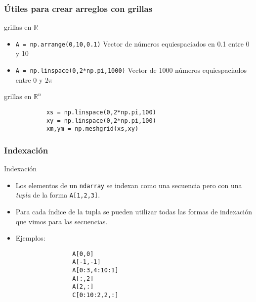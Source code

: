 \documentclass{beamer}
\begin{document}
\begin{frame}[fragile]
    \frametitle{Útiles para crear arreglos con grillas}
    \begin{block}{grillas en $\mathbb{R}$}
        \begin{itemize}
            \item \texttt{A = np.arrange(0,10,0.1)} Vector de números equiespaciados en 0.1 entre 0 y 10
            \item \texttt{A = np.linspace(0,2*np.pi,1000)} Vector de 1000 números equiespaciados entre 0 y $2\pi$
        \end{itemize}
    \end{block}
    \begin{block}{grillas en $\mathbb{R}^n$}
        \begin{verbatim}
            xs = np.linspace(0,2*np.pi,100)
            xy = np.linspace(0,2*np.pi,100)
            xm,ym = np.meshgrid(xs,xy)
        \end{verbatim}
    \end{block}
    \end{frame}


\begin{frame}[fragile]
    \frametitle{Indexación}
    \begin{block}{Indexación}
        \begin{itemize}
            \item Los elementos de un {\tt ndarray} se indexan como una secuencia pero con una {\em tupla} de la forma \texttt{A[1,2,3]}.
            \item Para cada índice de la tupla se pueden utilizar todas las formas de indexación que vimos para las secuencias.
            \item Ejemplos:
            \begin{verbatim}
                A[0,0]
                A[-1,-1] 
                A[0:3,4:10:1]
                A[:,2]
                A[2,:]
                C[0:10:2,2,:]
            \end{verbatim}
       \end{itemize}
    \end{block}
    \end{frame}
\end{document}
